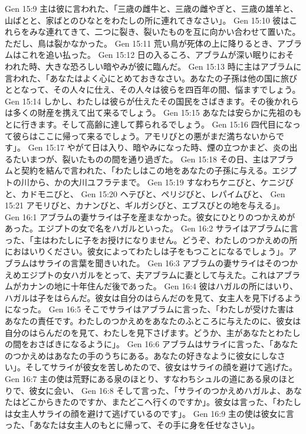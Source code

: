 Gen 15:9  主は彼に言われた、「三歳の雌牛と、三歳の雌やぎと、三歳の雄羊と、山ばとと、家ばとのひなとをわたしの所に連れてきなさい」。
Gen 15:10  彼はこれらをみな連れてきて、二つに裂き、裂いたものを互に向かい合わせて置いた。ただし、鳥は裂かなかった。
Gen 15:11  荒い鳥が死体の上に降りるとき、アブラムはこれを追い払った。
Gen 15:12  日の入るころ、アブラムが深い眠りにおそわれた時、大きな恐ろしい暗やみが彼に臨んだ。
Gen 15:13  時に主はアブラムに言われた、「あなたはよく心にとめておきなさい。あなたの子孫は他の国に旅びととなって、その人々に仕え、その人々は彼らを四百年の間、悩ますでしょう。
Gen 15:14  しかし、わたしは彼らが仕えたその国民をさばきます。その後かれらは多くの財産を携えて出て来るでしょう。
Gen 15:15  あなたは安らかに先祖のもとに行きます。そして高齢に達して葬られるでしょう。
Gen 15:16  四代目になって彼らはここに帰って来るでしょう。アモリびとの悪がまだ満ちないからです」。
Gen 15:17  やがて日は入り、暗やみになった時、煙の立つかまど、炎の出るたいまつが、裂いたものの間を通り過ぎた。
Gen 15:18  その日、主はアブラムと契約を結んで言われた、「わたしはこの地をあなたの子孫に与える。エジプトの川から、かの大川ユフラテまで。
Gen 15:19  すなわちケニびと、ケニジびと、カドモニびと、
Gen 15:20  ヘテびと、ペリジびと、レパイムびと、
Gen 15:21  アモリびと、カナンびと、ギルガシびと、エブスびとの地を与える」。
Gen 16:1  アブラムの妻サライは子を産まなかった。彼女にひとりのつかえめがあった。エジプトの女で名をハガルといった。
Gen 16:2  サライはアブラムに言った、「主はわたしに子をお授けになりません。どうぞ、わたしのつかえめの所におはいりください。彼女によってわたしは子をもつことになるでしょう」。アブラムはサライの言葉を聞きいれた。
Gen 16:3  アブラムの妻サライはそのつかえめエジプトの女ハガルをとって、夫アブラムに妻として与えた。これはアブラムがカナンの地に十年住んだ後であった。
Gen 16:4  彼はハガルの所にはいり、ハガルは子をはらんだ。彼女は自分のはらんだのを見て、女主人を見下げるようになった。
Gen 16:5  そこでサライはアブラムに言った、「わたしが受けた害はあなたの責任です。わたしのつかえめをあなたのふところに与えたのに、彼女は自分のはらんだのを見て、わたしを見下さげます。どうか、主があなたとわたしの間をおさばきになるように」。
Gen 16:6  アブラムはサライに言った、「あなたのつかえめはあなたの手のうちにある。あなたの好きなように彼女にしなさい」。そしてサライが彼女を苦しめたので、彼女はサライの顔を避けて逃げた。
Gen 16:7  主の使は荒野にある泉のほとり、すなわちシュルの道にある泉のほとりで、彼女に会い、
Gen 16:8  そして言った、「サライのつかえめハガルよ、あなたはどこからきたのですか、またどこへ行くのですか」。彼女は言った、「わたしは女主人サライの顔を避けて逃げているのです」。
Gen 16:9  主の使は彼女に言った、「あなたは女主人のもとに帰って、その手に身を任せなさい」。
